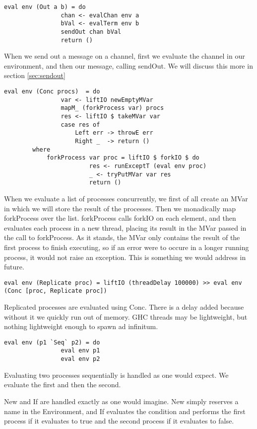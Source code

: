 \begin{verbatim}
eval env (Out a b) = do 
                chan <- evalChan env a
                bVal <- evalTerm env b
                sendOut chan bVal
                return ()
\end{verbatim}
When we send out a message on a channel, first we evaluate the channel in our environment, and then our message, calling sendOut. We will discuss this more in section \ref{sec:sendout}
\begin{verbatim}
eval env (Conc procs)  = do
                var <- liftIO newEmptyMVar 
                mapM_ (forkProcess var) procs
                res <- liftIO $ takeMVar var
                case res of
                    Left err -> throwE err
                    Right _  -> return ()
        where
            forkProcess var proc = liftIO $ forkIO $ do
                        res <- runExceptT (eval env proc)
                        _ <- tryPutMVar var res
                        return ()
\end{verbatim}
When we evaluate a list of processes concurrently, we first of all create an MVar in which we will store the result of the processes. Then we monadically map forkProcess over the list. forkProcess calls forkIO on each element, and then evaluates each process in a new thread, placing its result in the MVar passed in the call to forkProcess. As it stands, the MVar only contains the result of the first process to finish executing, so if an error were to occure in a longer running process, it
would not raise an exception. This is something we would address in future. 

\begin{verbatim}
eval env (Replicate proc) = liftIO (threadDelay 100000) >> eval env (Conc [proc, Replicate proc])
\end{verbatim}
Replicated processes are evaluated using Conc. There is a delay added because without it we quickly run out of memory. GHC threads may be lightweight, but nothing lightweight enough to spawn ad infinitum.

\begin{verbatim}
eval env (p1 `Seq` p2) = do
                eval env p1
                eval env p2
\end{verbatim}
Evaluating two processes sequentially is handled as one would expect. We evaluate the first and then the second.

New and If are handled exactly as one would imagine. New simply reserves a name in the Environment, and If evaluates the condition and performs the first process if it evaluates to true and the second process if it evaluates to false.


